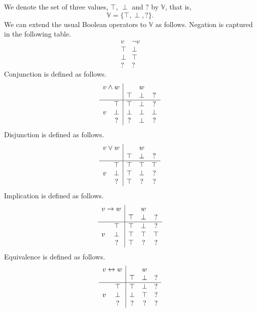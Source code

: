 \documentclass[12pt]{article}
\theoremstyle{definition}
\begin{document}
We denote the set of three values, $\top$, $\perp$ and $?$ by $\mathbb{V}$, that is,
\[
\mathbb{V} = \{ \top, \perp, \mathord{?} \}.
\]
We can extend the usual Boolean operators to $\mathbb{V}$ as follows.  Negation is captured in the following table.
\[
\begin{array}{c|c}
v & \neg v\\\hline
\top & \perp\\
\perp & \top\\
\mathord{?} & \mathord{?}
\end{array}
\]
Conjunction is defined as follows.
\[
\begin{array}{cc|ccc}
\multicolumn{2}{c|}{v \wedge w} & & w &\\
&& \top & \perp & \mathord{?}\\\hline
& \top & \top & \perp & \mathord{?}\\
v & \perp & \perp & \perp & \perp\\
& \mathord{?} & \mathord{?} & \perp & \mathord{?}
\end{array}
\]
Disjunction is defined as follows.
\[
\begin{array}{cc|ccc}
\multicolumn{2}{c|}{v \vee w} & & w &\\
&& \top & \perp & \mathord{?}\\\hline
& \top & \top & \top & \top\\
v & \perp & \top & \perp & \mathord{?}\\
& \mathord{?} & \top & \mathord{?} & \mathord{?}
\end{array}
\]
Implication is defined as follows.
\[
\begin{array}{cc|ccc}
\multicolumn{2}{c|}{v \rightarrow w} & & w &\\
&& \top & \perp & \mathord{?}\\\hline
& \top & \top & \perp & ?\\
v & \perp & \top & \top & \top\\
& \mathord{?} & \top & ? & ?
\end{array}
\]
Equivalence is defined as follows.
\[
\begin{array}{cc|ccc}
\multicolumn{2}{c|}{v \leftrightarrow w} & & w &\\
&& \top & \perp & \mathord{?}\\\hline
& \top & \top & \perp & ?\\
v & \perp & \perp & \top & ?\\
& \mathord{?} & ? & ? & ?
\end{array}
\]
\end{document}
